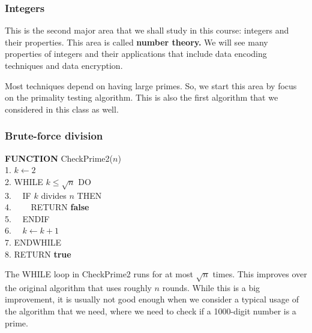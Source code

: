 

\begin{frame}\frametitle{Integers}
  This is the second major area that we shall study in this course:
  integers and their properties.  This area is called {\bf number
    theory.}  We will see many properties of integers and their
  applications that include data encoding techniques and data
  encryption.

  Most techniques depend on having large primes.  So, we start this
  area by focus on the primality testing algorithm.  This is also the
  first algorithm that we considered in this class as well.
\end{frame}

\begin{frame}\frametitle{Brute-force division}
  \begin{tcolorbox}
    {\bf FUNCTION} CheckPrime2($n$)\\
    1. $k\leftarrow 2$\\
    2. WHILE $k\leq\sqrt{n}$ DO\\
    3. \ \ IF $k$ divides $n$ THEN\\
    4. \ \ \ \ RETURN {\bf false}\\
    5. \ \ ENDIF\\
    6. \ \ $k\leftarrow k+1$\\
    7. ENDWHILE\\
    8. RETURN {\bf true}
  \end{tcolorbox}

  The WHILE loop in CheckPrime2 runs for at most $\sqrt{n}$ times.  This
  improves over the original algorithm that uses roughly $n$ rounds.
  While this is a big improvement, it is usually not good enough when
  we consider a typical usage of the algorithm that we need, where we
  need to check if a 1000-digit number is a prime.
\end{frame}

